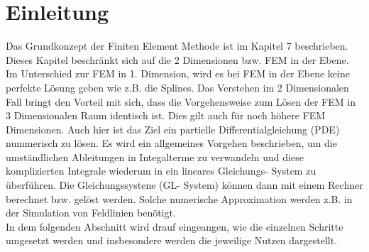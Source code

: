 %
%
%
\section{Einleitung\label{fem:section:einleitung}}
Das Grundkonzept der Finiten Element Methode ist im Kapitel 7 beschrieben. Dieses  Kapitel beschränkt sich auf die 2 Dimensionen bzw. FEM in der Ebene. Im Unterschied zur FEM in 1. Dimension, wird es bei FEM in der Ebene keine perfekte Lösung geben wie z.B. die Splines. Das Verstehen im 2 Dimensionalen Fall bringt den Vorteil mit sich, dass die Vorgehensweise zum Lösen der FEM in 3 Dimensionalen Raum identisch ist. Dies gilt auch für noch höhere FEM Dimensionen. Auch hier ist das Ziel ein partielle Differentialgleichung (PDE) nummerisch zu lösen. Es wird ein allgemeines Vorgehen beschrieben, um die umständlichen Ableitungen in Integalterme zu verwandeln und diese komplizierten Integrale wiederum in ein lineares Gleichungs- System zu überführen. Die Gleichungssystene (GL- System) können dann mit einem Rechner berechnet bzw. gelöst  werden. Solche numerische Approximation werden z.B. in der Simulation von Feldlinien benötigt. \\

In dem folgenden Abschnitt wird drauf eingeangen, wie die einzelnen Schritte umgesetzt werden und insbesondere werden die jeweilige Nutzen dargestellt.

